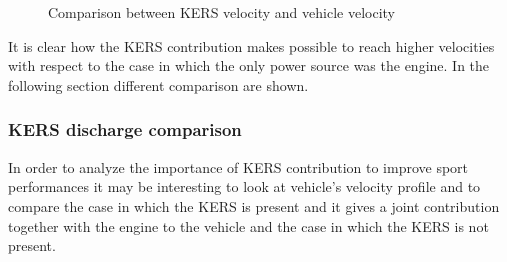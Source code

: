 \documentclass[11pt]{article}
\begin{document}
\begin{figure}[H]
	\centering
	 \\
	 \\
	\caption{Comparison between KERS velocity \protect{} and vehicle velocity \protect{}}
	\label{fig: kers vel plus vehicle vel}
\end{figure}

It is clear how the KERS contribution makes possible to reach higher velocities with respect to the case in which the only power source was the engine.
In the following section different comparison are shown.

\subsubsection{KERS discharge comparison}

In order to analyze the importance of KERS contribution to improve sport performances it may be interesting to look at vehicle's velocity profile and to compare the case in which the KERS is present and it gives a joint contribution together with the engine to the vehicle and the case in which the KERS is not present.
\end{document}
